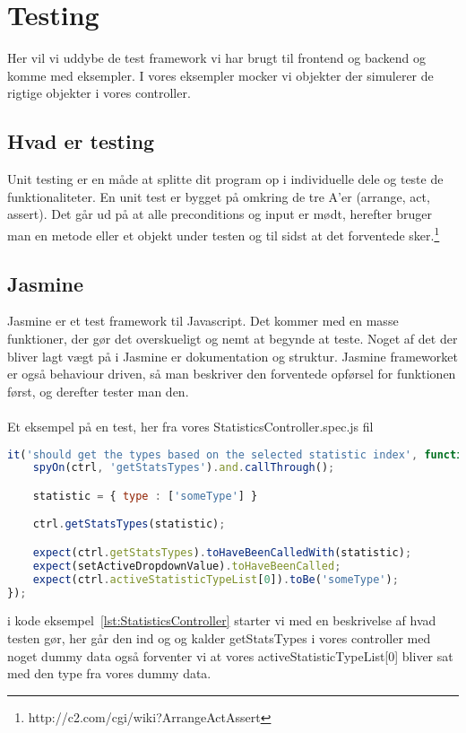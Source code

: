 \section{Testing}
Her vil vi uddybe de test framework vi har brugt til frontend og backend og komme
med eksempler. I vores eksempler mocker vi objekter der simulerer de rigtige objekter i vores controller.
\subsection{Hvad er testing}
Unit testing er en måde at splitte dit program op i individuelle dele og teste de funktionaliteter.
En unit test er bygget på omkring de tre A'er (arrange, act, assert). Det går ud på at alle
preconditions og input er mødt, herefter bruger man en metode eller et objekt under testen og til sidst at det forventede sker.\footnote{http://c2.com/cgi/wiki?ArrangeActAssert}
\subsection{Jasmine}
Jasmine er et test framework til Javascript. Det kommer med en masse funktioner, 
der gør det overskueligt og nemt at begynde at teste.
Noget af det der bliver lagt vægt på i Jasmine er dokumentation og struktur. Jasmine frameworket er 
også behaviour driven, så man beskriver den forventede opførsel for funktionen først, og derefter tester man den.
\\\\
Et eksempel på en test, her fra vores StatisticsController.spec.js fil
\begin{lstlisting}[caption={StatisticsController.spec.js}, language={JavaScript}, label={lst:StatisticsController}]
it('should get the types based on the selected statistic index', function() {
    spyOn(ctrl, 'getStatsTypes').and.callThrough();

    statistic = { type : ['someType'] }

    ctrl.getStatsTypes(statistic);

    expect(ctrl.getStatsTypes).toHaveBeenCalledWith(statistic);
    expect(setActiveDropdownValue).toHaveBeenCalled;
    expect(ctrl.activeStatisticTypeList[0]).toBe('someType');
});
\end{lstlisting}
i kode eksempel~\ref{lst:StatisticsController} starter vi med en beskrivelse af hvad testen gør, her går den ind og og kalder getStatsTypes i vores controller
med noget dummy data også forventer vi at vores activeStatisticTypeList[0] bliver sat med den type fra vores dummy data.

